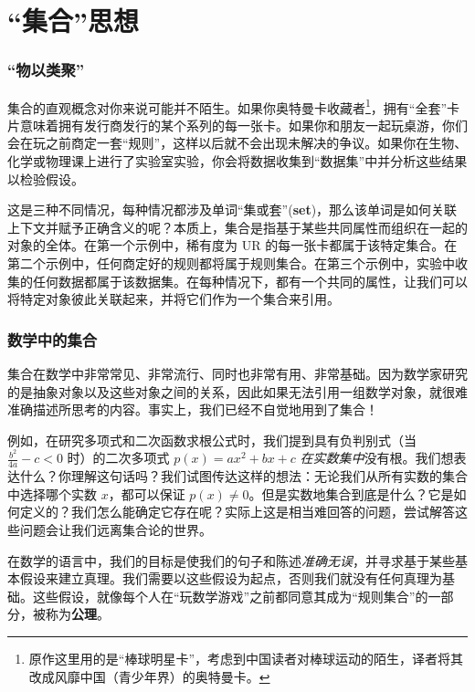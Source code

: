 \section{``集合''思想}

\subsubsection*{``物以类聚''}

集合的直观概念对你来说可能并不陌生。如果你奥特曼卡收藏者\footnote{原作这里用的是``棒球明星卡''，考虑到中国读者对棒球运动的陌生，译者将其改成风靡中国（青少年界）的奥特曼卡。}，拥有``全套''卡片意味着拥有发行商发行的某个系列的每一张卡。如果你和朋友一起玩桌游，你们会在玩之前商定一套``规则''，这样以后就不会出现未解决的争议。如果你在生物、化学或物理课上进行了实验室实验，你会将数据收集到``数据集''中并分析这些结果以检验假设。

这是三种不同情况，每种情况都涉及单词``集或套''(\textbf{set})，那么该单词是如何关联上下文并赋予正确含义的呢？本质上，集合是指基于某些共同属性而组织在一起的对象的全体。在第一个示例中，稀有度为 UR 的每一张卡都属于该特定集合。在第二个示例中，任何商定好的规则都将属于规则集合。在第三个示例中，实验中收集的任何数据都属于该数据集。在每种情况下，都有一个共同的属性，让我们可以将特定对象彼此关联起来，并将它们作为一个集合来引用。

\subsubsection*{数学中的集合}

集合在数学中非常常见、非常流行、同时也非常有用、非常基础。因为数学家研究的是抽象对象以及这些对象之间的关系，因此如果无法引用一组数学对象，就很难准确描述所思考的内容。事实上，我们已经不自觉地用到了集合！

例如，在研究多项式和二次函数求根公式时，我们提到具有负判别式（当 $\frac{b^2}{4a} - c < 0$ 时）的二次多项式 $p(x) = ax^2 + bx + c$ \emph{在实数集中}没有根。我们想表达什么？你理解这句话吗？我们试图传达这样的想法：无论我们从所有实数的集合中选择哪个实数 $x$，都可以保证 $p(x) \ne 0$。但是实数地集合到底是什么？它是如何定义的？我们怎么能确定它存在呢？实际上这是相当难回答的问题，尝试解答这些问题会让我们远离集合论的世界。

在数学的语言中，我们的目标是使我们的句子和陈述\emph{准确无误}，并寻求基于某些基本假设来建立真理。我们需要以这些假设为起点，否则我们就没有任何真理为基础。这些假设，就像每个人在``玩数学游戏''之前都同意其成为``规则集合''的一部分，被称为\textbf{公理}。

